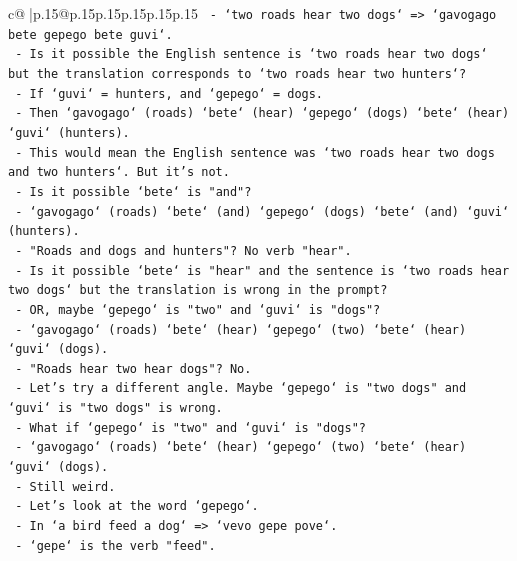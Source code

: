\documentclass{article}
\begin{document}
{\begin{supertabular}{c@{$\;$}|p{.15\linewidth}@{}p{.15\linewidth}p{.15\linewidth}p{.15\linewidth}p{.15\linewidth}p{.15\linewidth}}
{{{\texttt{                   {-} `two roads hear two dogs` => `gavogago bete gepego bete guvi`.} \\
\texttt{                   {-} Is it possible the English sentence is `two roads hear two dogs` but the translation corresponds to `two roads hear two hunters`?} \\
\texttt{                     {-} If `guvi` = hunters, and `gepego` = dogs.} \\
\texttt{                     {-} Then `gavogago` (roads) `bete` (hear) `gepego` (dogs) `bete` (hear) `guvi` (hunters).} \\
\texttt{                     {-} This would mean the English sentence was `two roads hear two dogs and two hunters`. But it's not.} \\
\texttt{                   {-} Is it possible `bete` is "and"?} \\
\texttt{                     {-} `gavogago` (roads) `bete` (and) `gepego` (dogs) `bete` (and) `guvi` (hunters).} \\
\texttt{                     {-} "Roads and dogs and hunters"? No verb "hear".} \\
\texttt{                   {-} Is it possible `bete` is "hear" and the sentence is `two roads hear two dogs` but the translation is wrong in the prompt?} \\
\texttt{                   {-} OR, maybe `gepego` is "two" and `guvi` is "dogs"?} \\
\texttt{                     {-} `gavogago` (roads) `bete` (hear) `gepego` (two) `bete` (hear) `guvi` (dogs).} \\
\texttt{                     {-} "Roads hear two hear dogs"? No.} \\
\texttt{                   {-} Let's try a different angle. Maybe `gepego` is "two dogs" and `guvi` is "two dogs" is wrong.} \\
\texttt{                   {-} What if `gepego` is "two" and `guvi` is "dogs"?} \\
\texttt{                     {-} `gavogago` (roads) `bete` (hear) `gepego` (two) `bete` (hear) `guvi` (dogs).} \\
\texttt{                     {-} Still weird.} \\
\texttt{                   {-} Let's look at the word `gepego`.} \\
\texttt{                     {-} In `a bird feed a dog` => `vevo gepe pove`.} \\
\texttt{                     {-} `gepe` is the verb "feed".} \\
}}}
\end{supertabular}}
\end{document}
